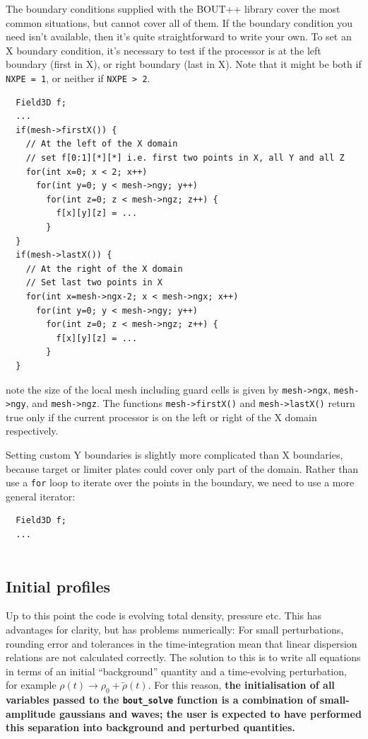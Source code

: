 \documentclass[12pt]{article}
\newcommand{\code}[1]{\texttt{#1}}
\begin{document}
The boundary conditions supplied with the BOUT++ library cover the most common situations,
but cannot cover all of them. If the boundary condition you need isn't
available, then it's quite straightforward
to write your own. To set an X boundary condition, it's necessary to test if the processor
is at the left boundary (first in X), or right boundary (last in X). Note that it might be
both if \code{NXPE = 1}, or neither if \code{NXPE > 2}. 
\begin{lstlisting}
  Field3D f;
  ...
  if(mesh->firstX()) {
    // At the left of the X domain
    // set f[0:1][*][*] i.e. first two points in X, all Y and all Z
    for(int x=0; x < 2; x++)
      for(int y=0; y < mesh->ngy; y++)
        for(int z=0; z < mesh->ngz; z++) {
          f[x][y][z] = ...
        }
  }
  if(mesh->lastX()) {
    // At the right of the X domain
    // Set last two points in X
    for(int x=mesh->ngx-2; x < mesh->ngx; x++)
      for(int y=0; y < mesh->ngy; y++)
        for(int z=0; z < mesh->ngz; z++) {
          f[x][y][z] = ...
        }
  }
\end{lstlisting}
note the size of the local mesh including guard cells is given by \code{mesh->ngx}, \code{mesh->ngy},
and \code{mesh->ngz}. The functions \code{mesh->firstX()} and \code{mesh->lastX()} return true only
if the current processor is on the left or right of the X domain respectively.

Setting custom Y boundaries is slightly more complicated than X boundaries, because target or limiter
plates could cover only part of the domain. Rather than use a \code{for} loop to iterate over the points
in the boundary, we need to use a more general iterator:

\begin{lstlisting}
  Field3D f;
  ...
  
\end{lstlisting}

\subsection{Initial profiles}
Up to this point the code is evolving total density, pressure etc. This has advantages for clarity,
but has problems numerically: For small perturbations, rounding error and tolerances in the time-integration
mean that linear dispersion relations are not calculated correctly. The solution to this
is to write all equations in terms of an initial ``background'' quantity and a time-evolving
perturbation, for example $\rho\left(t\right) \rightarrow \rho_0 + \tilde{\rho}\left(t\right)$.
For this reason, {\bf the initialisation of all variables passed to the \code{bout\_solve} function
is a combination of small-amplitude gaussians and waves; the user is expected to have performed this
separation into background and perturbed quantities.} 
\end{document}
